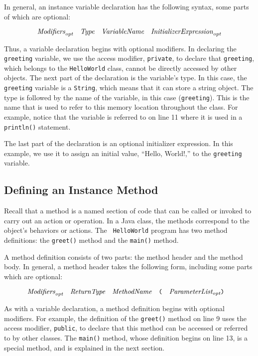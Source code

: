 \noindent In general, an instance variable declaration has the following
syntax, some parts of which are optional:

$$
\hbox{\it Modifiers}_{\hbox{\scriptsize\it opt}}\quad
\hbox{\it Type}\quad
\hbox{\it VariableName}\quad
\hbox{\it InitializerExpression}_{\hbox{\scriptsize\it opt}}
$$

\noindent Thus, a variable declaration begins with optional modifiers. 
In declaring the {\tt greeting} variable, we use the access modifier,
{\tt private}, to declare that {\tt greeting}, which belongs to the
{\tt HelloWorld} class, cannot be directly accessed by other
objects. The next part of the declaration is the variable's type. In
this case, the {\tt greeting} variable is a {\tt String}, which means
that it can store a string object.  The type is followed by the name
of the variable, in this case ({\tt greeting}). This is the name that
is used to refer to this memory location throughout the class. For
example, notice that the variable is referred to on line 11 where it
is used in a {\tt println()} statement.

The last part of the declaration is an optional initializer
expression. In this example, we use it to assign an initial value,
``Hello, World!,'' to the {\tt greeting} variable.  

\subsection{Defining an Instance Method}

Recall that a method is a named section of code that can be called or
invoked to carry out an action or operation.  In a Java class, the
methods correspond to the object's behaviors or actions. The {\tt
HelloWorld} program has two method definitions: the {\tt greet()}
method and the {\tt main()} method.

A method definition consists of two parts: the method header and the
method body. In general, a method header takes the following
form, including some parts which are optional:

$$
\hbox{\it Modifiers}_{\hbox{\scriptsize\it opt}}\quad
\hbox{\it ReturnType}\quad
\hbox{\it MethodName}\quad
\hbox{\tt (}\quad
\hbox{\it ParameterList}_{\hbox{\scriptsize\it opt}}
\hbox{\tt )}\quad
$$

\noindent As with a variable declaration, a method definition
begins with optional modifiers. For example, the definition of the
{\tt greet()} method on line 9 uses the access modifier, {\tt public},
to declare that this method can be accessed or referred to by other
classes.  The {\tt main()} method, whose definition begins on line 13,
is a special method, and is explained in the next section.

